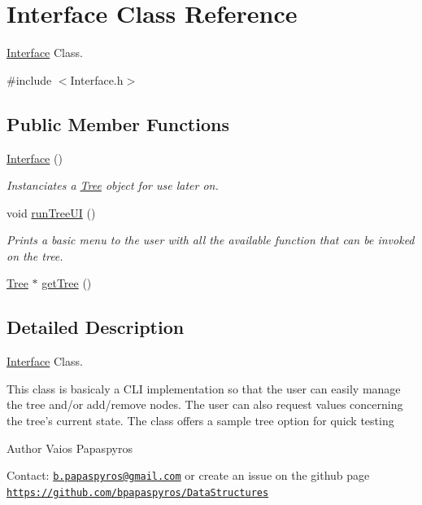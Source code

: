 \hypertarget{class_interface}{\section{Interface Class Reference}
\label{class_interface}
}


\hyperlink{class_interface}{Interface} Class.  




{\ttfamily \#include $<$Interface.\-h$>$}

\subsection*{Public Member Functions}
\begin{DoxyCompactItemize}
\item 
\hyperlink{class_interface_a4406d74c75bdfe150bf72be1f1cda8b1}{Interface} ()
\begin{DoxyCompactList}\small\item\em Instanciates a \hyperlink{class_tree}{Tree} object for use later on. \end{DoxyCompactList}\item 
void \hyperlink{class_interface_a39dfccfcfc9027f148f1a0280ff34fe5}{run\-Tree\-U\-I} ()
\begin{DoxyCompactList}\small\item\em Prints a basic menu to the user with all the available function that can be invoked on the tree. \end{DoxyCompactList}\item 
\hyperlink{class_tree}{Tree} $\ast$ \hyperlink{class_interface_a52fce95d6f5f1060df253df752ef89e2}{get\-Tree} ()
\end{DoxyCompactItemize}


\subsection{Detailed Description}
\hyperlink{class_interface}{Interface} Class. 

This class is basicaly a C\-L\-I implementation so that the user can easily manage the tree and/or add/remove nodes. The user can also request values concerning the tree's current state. The class offers a sample tree option for quick testing

\begin{DoxyAuthor}{Author}
Vaios Papaspyros
\end{DoxyAuthor}
Contact\-: \href{mailto:b.papaspyros@gmail.com}{\tt b.\-papaspyros@gmail.\-com} or create an issue on the github page \href{https://github.com/bpapaspyros/DataStructures}{\tt https\-://github.\-com/bpapaspyros/\-Data\-Structures} 

